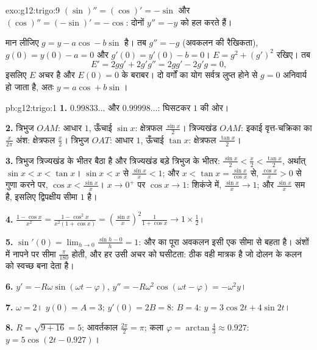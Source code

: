 \begin{solution}{exo:g12:trigo:9}
$(\sin)'' = (\cos)' = -\sin$ और $(\cos)'' = (-\sin)' = -\cos$: दोनों $y'' = -y$ को हल करते हैं।

मान लीजिए $g = y - a\cos - b\sin$ है। तब $g'' = -g$ (अवकलन की रैखिकता), $g(0) = y(0) - a = 0$ और $g'(0) = y'(0) - b = 0$। $E = g^2 + (g')^2$ रखिए। तब
\[
E' = 2g g' + 2g' g'' = 2g g' - 2g' g = 0,
\]
इसलिए $E$ अचर है और $E(0) = 0$ के बराबर। दो वर्गों का योग सर्वत्र लुप्त होने से
$g = 0$ अनिवार्य हो जाता है, अतः $y = a\cos + b\sin$।
\end{solution}

\begin{solution}{pb:g12:trigo:1}
\textbf{1.} $0.99833\ldots$ और $0.99998\ldots$: घिसटकर $1$ की ओर।

\textbf{2.} त्रिभुज $OAM$: आधार $1$, ऊँचाई $\sin x$: क्षेत्रफल $\frac{\sin x}{2}$।
त्रिज्यखंड $OAM$: इकाई वृत्त-चक्रिका का $\frac{x}{2\pi}$ अंश: क्षेत्रफल $\frac x2$। त्रिभुज
$OAT$: आधार $1$, ऊँचाई $\tan x$: क्षेत्रफल $\frac{\tan x}{2}$।

\textbf{3.} त्रिभुज त्रिज्यखंड के भीतर बैठा है और त्रिज्यखंड बड़े त्रिभुज के
भीतर: $\frac{\sin x}{2} < \frac x2 < \frac{\tan x}{2}$, अर्थात् $\sin x < x < \tan x$। $\sin x < x$ से $\frac{\sin x}{x} < 1$; और $x < \tan x = \frac{\sin x}{\cos x}$ से, $\frac{\cos x}{x} > 0$ से गुणा करने
पर, $\cos x < \frac{\sin x}{x}$। $x \to 0^+$ पर $\cos x \to 1$: शिकंजे में, $\frac{\sin x}{x} \to 1$; और $\frac{\sin x}{x}$ सम है, इसलिए द्विपक्षीय
सीमा $1$ है।

\textbf{4.} $\frac{1 - \cos x}{x^2} =
\frac{1 - \cos^2 x}{x^2 (1 + \cos x)} =
\left(\frac{\sin x}{x}\right)^2 \frac{1}{1 + \cos x}
\to 1 \times \frac12$।

\textbf{5.} $\sin'(0) = \lim_{h \to 0} \frac{\sin h - 0}{h} =
1$:  और  का पूरा अवकलन इसी एक सीमा से बहता है। अंशों
में नापने पर सीमा $\frac{\pi}{180}$ होती, और हर  उसी अचर को घसीटता:  ठीक वही
मात्रक है जो दोलन के कलन को स्वच्छ बना देता है।

\textbf{6.} $y' = -R\omega\sin(\omega t - \varphi)$, $y'' = -R\omega^2\cos(\omega t - \varphi) = -\omega^2 y$।

\textbf{7.} $\omega = 2$। $y(0) = A = 3$; $y'(0) = 2B = 8$: $B = 4$: $y = 3\cos 2t + 4\sin 2t$।

\textbf{8.} $R = \sqrt{9 + 16} = 5$; आवर्तकाल $\frac{2\pi}{2} = \pi$; कला $\varphi = \arctan\frac43 \approx 0.927$: $y = 5\cos(2t - 0.927)$।


\end{solution}
